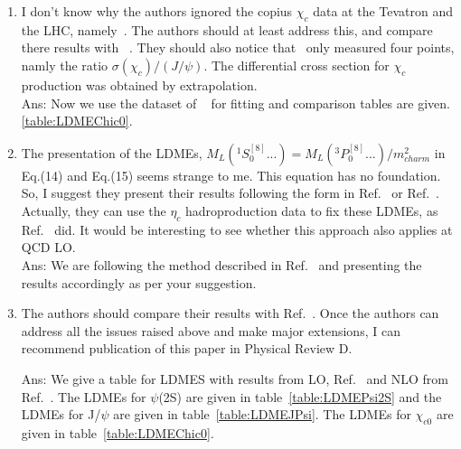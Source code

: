 \documentclass[aps,prc,preprint,superscriptaddress,showpacs,showkeys,amsmath]{revtex4-1}
\begin{document}
\begin{enumerate}
\item I don’t know why the authors ignored the copius $\chi_c$ data at the Tevatron 
and the LHC, namely~\cite{LHCb:2012af,Aaij:2013dja,Chatrchyan:2012ub,ATLAS:2014ala}. The authors 
should at least address this, and compare there results with ~\cite{Jia:2014jfa}. They should also notice that~\cite{Abe:1997yz} 
only measured four points, namly the ratio $\sigma(\chi_c)/(J/\psi)$. The differential 
cross section for $\chi_c$ production was obtained by extrapolation. \\
{\color{blue}
Ans: Now we use the dataset of ~\cite{LHCb:2012af,Aaij:2013dja,Chatrchyan:2012ub,ATLAS:2014ala} for fitting and
comparison tables are given.%
\ref{table:LDMEChic0}.
}

\item The presentation of the LDMEs, $M_L(^1S^{[8]}_0 ...) = M_L(^3P^{[8]}_0 ...)/m^2_{charm}$
in Eq.(14) and Eq.(15) seems strange to me. This equation has no foundation. 
So, I suggest they present their results following the form in Ref.~\cite{Beneke:1996yw} 
or Ref.~\cite{Cho:1995vh}. 
Actually, they can use the $\eta_c$ hadroproduction data to fix these LDMEs, as 
Ref.~\cite{Zhang:2014ybe} did. It would be interesting to see whether this approach also applies 
at QCD LO.\\

{\color{blue}
Ans: We are following the method described in Ref.~\cite{Cho:1995vh,Beneke:1996yw} and
presenting the results accordingly as per your suggestion.
}

\item The authors should compare their results with Ref.~\cite{Cho:1995vh, Braaten:1999qk, Sharma:2012dy}. Once the authors 
can address all the issues raised above and make major extensions, I can recommend 
publication of this paper in Physical Review D.\\
{\color{blue}
Ans: We give a table for LDMES with results from LO, Ref.~\cite{Cho:1995vh, Braaten:1999qk, Sharma:2012dy} and 
NLO from Ref.~\cite{Butenschoen:2010rq,Ma:2010jj}. The LDMEs for $\psi$(2S) are given in table~\ref{table:LDMEPsi2S} and 
the LDMEs for J/$\psi$ are given in table~\ref{table:LDMEJPsi}. The  LDMEs for $\chi_{c0}$ are given in 
table~\ref{table:LDMEChic0}.

}
\end{enumerate}
\end{document}
